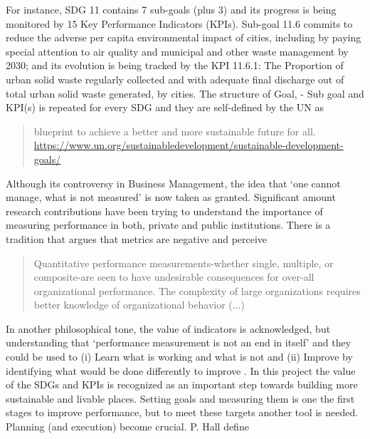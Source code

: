 For instance, SDG 11 contains 7 sub-goals (plus 3) and its progress is being monitored by 15 Key Performance Indicators (KPIs). Sub-goal 11.6 commits to reduce the adverse per capita environmental impact of cities, including by paying special attention to air quality and municipal and other waste management by 2030; and its evolution is being tracked by the KPI 11.6.1: The Proportion of urban solid waste regularly collected and with adequate final discharge out of total urban solid waste generated, by cities. The structure of Goal, - Sub goal and KPI(s) is repeated for every SDG and they are self-defined by the UN as

\begin{quote}
    blueprint to achieve a better and more sustainable future for all.
    \url{https://www.un.org/sustainabledevelopment/sustainable-development-goals/}
\end{quote}
\par

Although its controversy in Business Management, the idea that ‘one cannot manage, what is not measured’ is now taken as granted. Significant amount research contributions have been trying to understand the importance of measuring performance in both, private and public institutions. There is a tradition that argues that metrics are negative and perceive
\begin{quote}
    Quantitative performance measurements-whether single, multiple, or composite-are seen to have undesirable consequences for over-all organizational performance. The complexity of large organizations requires better knowledge of organizational behavior (...)
    \cite{Ridgway2016}
\end{quote}
In another philosophical tone, the value of indicators is acknowledged, but understanding that ‘performance measurement is not an end in itself’ and they could be used to (i) Learn what is working and what is not and (ii) Improve by identifying what would be done differently to improve \cite{Behn2003}.
In this project the value of the SDGs and KPIs is recognized as an important step towards building more sustainable and livable places. Setting goals and measuring them is one the first stages to improve performance, but to meet these targets another tool is needed. Planning (and execution) become crucial. P. Hall \cite{Hall1992} define 


